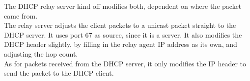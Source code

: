 The DHCP relay server kind off modifies both, dependent on where the packet came from. \\
The relay server adjusts the client packets to a unicast packet straight to the DHCP server. It uses port 67 as source, since it is a server. It also modifies the DHCP header slightly, by filling in the relay agent IP address as its own, and adjusting the hop count. \\ 
As for packets received from the DHCP server, it only modifies the IP header to send the packet to the DHCP client.
 